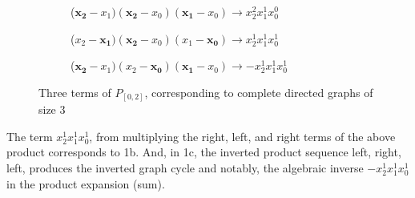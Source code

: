 \documentclass[11pt, oneside]{article} 	%
\begin{document}
\begin{figure}
\centering
\begin{subfigure}{.5\textwidth}
  \centering
  \caption{($\mathbf{x_2}-x_1)(\mathbf{x_2}-x_0)(\mathbf{x_1}-x_0) \rightarrow x_2^2x_1^1x_0^0$}
  \label{fig:sub1}
\end{subfigure}

\begin{subfigure}{.5\textwidth}

  \caption{($x_2-\mathbf{x_1})(\mathbf{x_2}-x_0)(x_1-\mathbf{x_0}) \rightarrow x_2^1x_1^1x_0^1$}
  \label{fig:sub2}
\end{subfigure}

\begin{subfigure}{.5\textwidth}

  \caption{($\mathbf{x_2}-x_1)(x_2-\mathbf{x_0})(\mathbf{x_1}-x_0) \rightarrow -x_2^1x_1^1x_0^1$}
  \label{fig:sub3}
\end{subfigure}


\caption{Three terms of  $P_{[0,2]}$, corresponding to complete directed graphs of size 3}
\label{fig:test}
\end{figure}

The term $x_2^1x_1^1x_0^1$, from multiplying the right, left, and right terms of the above product corresponds to 1b.  And, in 1c, the inverted product sequence left, right, left, produces the inverted graph cycle and notably, the algebraic inverse $-x_2^1x_1^1x_0^1$ in the product expansion (sum).
\end{document}
